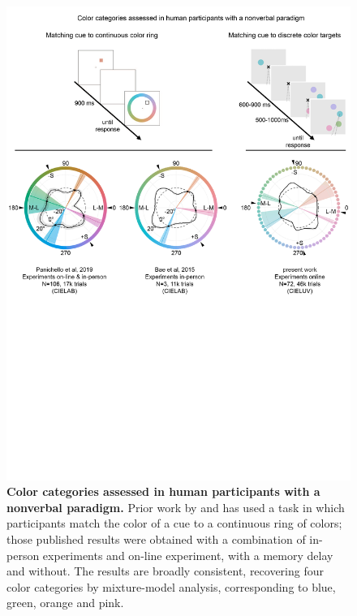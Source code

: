 \documentclass[9pt,biorxiv,lineno,onehalfspacing]{lapreprint}
\begin{document}
\begin{figure}
    \centering
    \begin{fullwidth}
    \includegraphics[width=\textwidth+4cm,trim={0 11cm 0 0},clip]{Outputs/Paper/Figures/flat/SI_Human_2.jpg}
    \caption{\textbf{Color categories assessed in human participants with a nonverbal paradigm. }
    Prior work by \citet{bae_why_2015} and \citet{panichello_error-correcting_2019} has used a task in which participants match the color of a cue to a continuous ring of colors; those published results were obtained with a combination of in-person experiments and on-line experiment, with a memory delay and without. The results are broadly consistent, recovering four color categories by mixture-model analysis, corresponding to blue, green, orange and pink. 
}
\end{fullwidth}
\end{figure}
\end{document}
